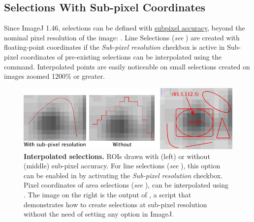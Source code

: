 

\subsection[Selections With Sub-pixel Coordinates]{Selections With Sub-pixel Coordinates\label{sub:Sub-pixel-Selections}}

Since ImageJ 1.46, selections can be defined with \href{http://en.wikipedia.org/wiki/Sub-pixel_resolution}{subpixel accuracy},
beyond the nominal pixel resolution of the image: .
Line Selections (\emph{see} ) are
created with floating-point coordinates if the \emph{Sub-pixel resolution}
checkbox is active in 
Sub-pixel coordinates of pre-existing selections can be interpolated
using the 
command. Interpolated points are easily noticeable on small selections
created on images zoomed 1200\% or greater.
\begin{figure}[h]
\noindent \includegraphics[scale=0.45]{images/SubPixel}\caption[Floating point selections]{\label{fig:Subpixel-selections}\textbf{Interpolated selections.}
ROIs drawn with (left) or without (middle) sub-pixel accuracy. For
line selections (\emph{see} ),
this option can be enabled in\textbf{ }\protect{}
by activating the \emph{Sub-pixel resolution} checkbox. Pixel coordinates
of area selections (\emph{see} ),
can be interpolated using \protect{}.
The image on the right is the output of \protect{},
a script that demonstrates how to create selections at sub-pixel resolution
without the need of setting any option in ImageJ.}
\end{figure}



